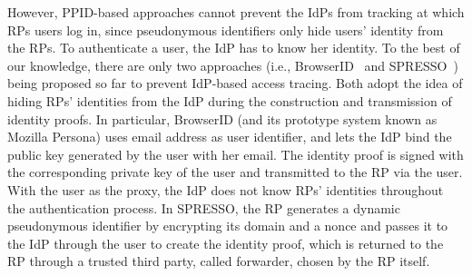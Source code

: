 
However, PPID-based approaches cannot prevent the IdPs from tracking at which RPs users log in, since pseudonymous identifiers only hide users' identity from the RPs. To authenticate a user, the IdP has to know her identity. To the best of our knowledge, there are only two approaches (i.e., BrowserID~\cite{persona} and SPRESSO~\cite{SPRESSO}) being proposed so far to prevent IdP-based access tracing. Both adopt the idea of hiding RPs' identities from the IdP during the construction and transmission of identity proofs. In particular, BrowserID (and its prototype system known as Mozilla Persona) uses email address as user identifier, and lets the IdP bind the public key generated by the user with her email. The identity proof is signed with the corresponding private key of the user and transmitted to the RP via the user. With the user as the proxy, the IdP does not know RPs' identities throughout the authentication process. In SPRESSO, the RP generates a dynamic pseudonymous identifier by encrypting its domain and a nonce and passes it to the IdP through the user to create the identity proof, which is returned to the RP through a trusted third party, called forwarder, chosen by the RP itself.




